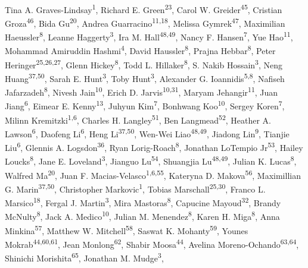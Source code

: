\documentclass[pdflatex,mathphys]{jnl}
\begin{document}
{Tina A. Graves-Lindsay\textsuperscript{1}, Richard E. Green\textsuperscript{23},
Carol W. Greider\textsuperscript{45}, Cristian Groza\textsuperscript{46}, Bida Gu\textsuperscript{20},
Andrea Guarracino\textsuperscript{11,18}, Melissa Gymrek\textsuperscript{47},
Maximilian Haeussler\textsuperscript{8}, Leanne Haggerty\textsuperscript{3},
Ira M. Hall\textsuperscript{48,49}, Nancy F. Hansen\textsuperscript{7}, Yue Hao\textsuperscript{11},
Mohammad Amiruddin Hashmi\textsuperscript{4}, David Haussler\textsuperscript{8},
Prajna Hebbar\textsuperscript{8}, Peter Heringer\textsuperscript{25,26,27},
Glenn Hickey\textsuperscript{8}, Todd L. Hillaker\textsuperscript{8},
S. Nakib Hossain\textsuperscript{3}, Neng Huang\textsuperscript{37,50},
Sarah E. Hunt\textsuperscript{3}, Toby Hunt\textsuperscript{3},
Alexander G. Ioannidis\textsuperscript{5,8}, Nafiseh Jafarzadeh\textsuperscript{8},
Nivesh Jain\textsuperscript{10}, Erich D. Jarvis\textsuperscript{10,31},
Maryam Jehangir\textsuperscript{11}, Juan Jiang\textsuperscript{6}, Eimear E. Kenny\textsuperscript{13},
Juhyun Kim\textsuperscript{7}, Bonhwang Koo\textsuperscript{10}, Sergey Koren\textsuperscript{7},
Milinn Kremitzki\textsuperscript{1,6}, Charles H. Langley\textsuperscript{51},
Ben Langmead\textsuperscript{52}, Heather A. Lawson\textsuperscript{6}, Daofeng Li\textsuperscript{6},
Heng Li\textsuperscript{37,50}, Wen-Wei Liao\textsuperscript{48,49}, Jiadong Lin\textsuperscript{9},
Tianjie Liu\textsuperscript{6}, Glennis A. Logsdon\textsuperscript{36},
Ryan Lorig-Roach\textsuperscript{8}, Jonathan LoTempio Jr\textsuperscript{53},
Hailey Loucks\textsuperscript{8}, Jane E. Loveland\textsuperscript{3}, Jianguo Lu\textsuperscript{54},
Shuangjia Lu\textsuperscript{48,49}, Julian K. Lucas\textsuperscript{8}, Walfred Ma\textsuperscript{20},
Juan F. Macias-Velasco\textsuperscript{1,6,55}, Kateryna D. Makova\textsuperscript{56},
Maximillian G. Marin\textsuperscript{37,50}, Christopher Markovic\textsuperscript{1},
Tobias Marschall\textsuperscript{25,30}, Franco L. Marsico\textsuperscript{18},
Fergal J. Martin\textsuperscript{3}, Mira Mastoras\textsuperscript{8},
Capucine Mayoud\textsuperscript{32}, Brandy McNulty\textsuperscript{8},
Jack A. Medico\textsuperscript{10}, Julian M. Menendez\textsuperscript{8},
Karen H. Miga\textsuperscript{8}, Anna Minkina\textsuperscript{57},
Matthew W. Mitchell\textsuperscript{58}, Saswat K. Mohanty\textsuperscript{59},
Younes Mokrab\textsuperscript{44,60,61}, Jean Monlong\textsuperscript{62},
Shabir Moosa\textsuperscript{44}, Avelina Moreno-Ochando\textsuperscript{63,64},
Shinichi Morishita\textsuperscript{65}, Jonathan M. Mudge\textsuperscript{3},
}
\end{document}
